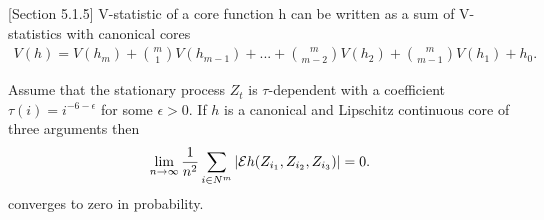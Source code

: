\begin{lemma}
\label{stm:decomposition}[Section 5.1.5]
 V-statistic of a core function h can be written as a sum of  V-statistics with canonical cores
\begin{align}
  V(h) = V(h_m) + \binom m 1 V(h_{m-1}) + ...+ \binom {m} {m-2} V(h_{2}) + \binom {m} {m-1} V(h_{1}) + h_0.
 \end{align}
\end{lemma}


\begin{lemma}
\label{lem:start}
Assume that the stationary process $Z_t$ is $\tau$-dependent with a coefficient $\tau(i) = i^{-6-\epsilon}$ for some $\epsilon>0$. If $h$ is a canonical and Lipschitz continuous core of three arguments then
 \begin{align}
 \lim_{n \to \infty} \frac{1}{n^2} \sum_{i \in N^{m}} |\mathcal{E}   h(Z_{i_1},Z_{i_2},Z_{i_3})| =0.
\end{align}
converges to zero in probability.
\end{lemma}

